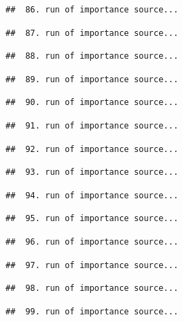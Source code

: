 \documentclass[
]{article}
\begin{document}
\begin{verbatim}
##  86. run of importance source...
\end{verbatim}

\begin{verbatim}
##  87. run of importance source...
\end{verbatim}

\begin{verbatim}
##  88. run of importance source...
\end{verbatim}

\begin{verbatim}
##  89. run of importance source...
\end{verbatim}

\begin{verbatim}
##  90. run of importance source...
\end{verbatim}

\begin{verbatim}
##  91. run of importance source...
\end{verbatim}

\begin{verbatim}
##  92. run of importance source...
\end{verbatim}

\begin{verbatim}
##  93. run of importance source...
\end{verbatim}

\begin{verbatim}
##  94. run of importance source...
\end{verbatim}

\begin{verbatim}
##  95. run of importance source...
\end{verbatim}

\begin{verbatim}
##  96. run of importance source...
\end{verbatim}

\begin{verbatim}
##  97. run of importance source...
\end{verbatim}

\begin{verbatim}
##  98. run of importance source...
\end{verbatim}

\begin{verbatim}
##  99. run of importance source...
\end{verbatim}
\end{document}
